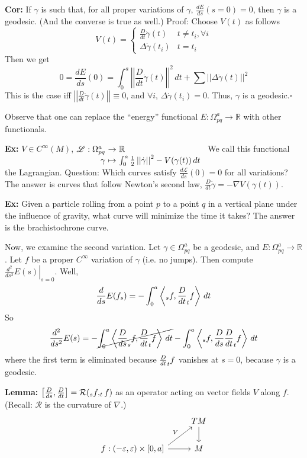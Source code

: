 \documentclass[10pt,letterpaper]{article}
\newcommand{\n}{\hfill\break}
\newcommand{\nn}{\vspace{0.5\baselineskip}\n}
\newcommand{\hangblock}[2]{\par\noindent\settowidth{\hangindent}{\textbf{#1: }}\textbf{#1: }\nolinebreak#2}
\newcommand{\lemma}[1]{\hangblock{Lemma}{#1}}
\newcommand{\cor}[1]{\hangblock{Cor}{#1}}
\newcommand{\ex}[1]{\hangblock{Ex}{#1}}
\newcommand{\proven}{\;$\square$\n}
\newcommand{\reals}{\mathbb{R}}
\newcommand{\R}{\reals}
\let\d\relax
\newcommand{\d}{\partial}
\newcommand{\comm}[1]{\left[#1\right]}
\newcommand{\abs}[1]{\left|#1\right|}
\newcommand{\map}[4]{\!\!\!\begin{array}[t]{rcl}#1 & \!\!\!\!\to & \!\!\!\!#2\\ {}#3 & \!\!\!\!\mapsto & \!\!\!\!#4\end{array}}
\newcommand{\restr}[1]{\left.#1\right|}
\newcommand{\norm}[1]{\abs{\abs{#1}}}
\newcommand{\iprod}[1]{\left<#1\right>}
\begin{document}
\cor{
	If $\gamma$ is such that, for all proper variations of $\gamma$, $\frac{dE}{ds}(s=0)=0$, then $\gamma$ is a geodesic. (And the converse is true as well.)\nn
	Proof: Choose $V(t)$ as follows
	\[
		V(t)=\left\{\begin{array}{ll}
			\frac{D}{dt}\dot\gamma(t) & t\ne{}t_{i},\forall{}i\\
			\Delta\dot\gamma(t_{i}) & t=t_{i}
		\end{array}\right.
	\]
	Then we get
	\[
		0=\frac{dE}{ds}(0)=\int_{0}^{a}\norm{\frac{D}{dt}\dot\gamma(t)}^{2}\,dt+\sum{}\norm{\Delta\dot\gamma(t)}^{2}
	\]
	This is the case iff $\norm{\frac{D}{dt}\dot\gamma(t)}\equiv{}0$, and $\forall{}i$, $\Delta\dot\gamma(t_{i})=0$. Thus, $\gamma$ is a geodesic.\proven
}

\par\noindent
Observe that one can replace the ``energy'' functional $E:\Omega_{pq}^{a}\to\R$ with other functionals.\n

\ex{
	$V\in{}C^{\infty}(M)$, $\map{\mathscr{L}:\Omega_{pq}^{a}}{\R}{\gamma}{\int_{0}^{a}\frac{1}{2}\norm{\dot\gamma}^{2}-V(\gamma(t))\,dt}$\n
	We call this functional the Lagrangian.\n
	Question: Which curves satisfy $\frac{d\mathscr{L}}{ds}(0)=0$ for all variations? The answer is curves that follow Newton's second law, $\frac{D}{dt}\dot\gamma=-\nabla{}V(\gamma(t))$.\n
}

\ex{
	Given a particle rolling from a point $p$ to a point $q$ in a vertical plane under the influence of gravity, what curve will minimize the time it takes? The answer is the brachistochrone curve.\n
}

\par\noindent
Now, we examine the second variation. Let $\gamma\in\Omega_{pq}^{a}$ be a geodesic, and $E:\Omega_{pq}^{a}\to\R$. Let $f$ be a proper $C^{\infty}$ variation of $\gamma$ (i.e. no jumps). Then compute $\restr{\frac{d^{2}}{ds^{2}}E(s)}_{s=0}$. Well,
\[
	\frac{d}{ds}E(f_{s})=-\int_{0}^{a}\iprod{\d_{s}f,\frac{D}{dt}\d_{t}f}\,dt
\]
So
\[
	\frac{d^{2}}{ds^{2}}E(s)=-\cancel{\int_{0}^{a}\iprod{\frac{D}{ds}\d_{s}f,\frac{D}{dt}\d_{t}f}\,dt}-\int_{0}^{a}\iprod{\d_{s}f,\frac{D}{ds}\frac{D}{dt}\d_{t}f}\,dt
\]
where the first term is eliminated because $\frac{D}{dt}\d_{t}f$ vanishes at $s=0$, because $\gamma$ is a geodesic.\n

\lemma{
	$\comm{\frac{D}{ds},\frac{D}{dt}}=\mathcal{R}(\d_{s}f,\d_{t}f)$ as an operator acting on vector fields $V$ along $f$. (Recall: $\mathcal{R}$ is the curvature of $\nabla$.)
	\[
		\begin{tikzcd}[ampersand replacement=\&]
			\&[-35pt] \& TM \arrow[d]\\
			f:(-\varepsilon,\varepsilon)\times[0,a] \& \phantom{\cdot} \arrow[ur,"V"] \arrow[r] \& M
		\end{tikzcd}
	\]
}
\end{document}
